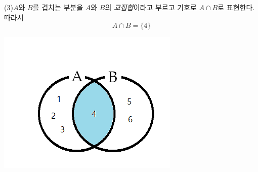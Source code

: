 \documentclass{oblivoir}
\begin{document}
\noindent
\begin{minipage}{0.65\textwidth}
(3)\:\(A\)와 \(B\)를 겹치는 부분을
\(A\)와 \(B\)의 \emph{교집합}이라고 부르고 기호로 \(A\cap B\)로 표현한다.
따라서
\[A\cap B=\{4\}\]
\end{minipage}
\begin{minipage}{0.3\textwidth}
\begin{center}
\includegraphics[width=\textwidth]{operations_1-3}
\end{center}
\end{minipage}
\end{document}
